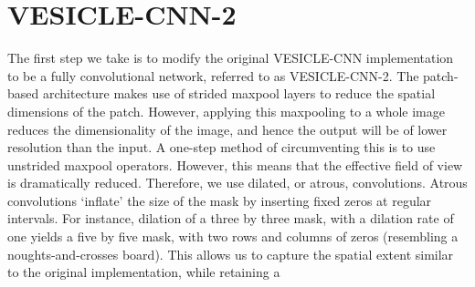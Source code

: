 \documentclass{article}
\begin{document}
\section*{VESICLE-CNN-2}
\label{sec:methods:vesicle}
The first step we take is to modify the original VESICLE-CNN implementation~\citep{roncal2014vesicle} to be a fully convolutional network, referred to as VESICLE-CNN-2.
The patch-based architecture makes use of strided maxpool layers to reduce the spatial dimensions of the patch.
However, applying this maxpooling to a whole image reduces the dimensionality of the image, and hence the output will be of lower resolution than the input.
A one-step method of circumventing this is to use unstrided maxpool operators.
However, this means that the effective field of view is dramatically reduced.
Therefore, we use dilated, or atrous, convolutions.
Atrous convolutions `inflate' the size of the mask by inserting fixed zeros at regular intervals.
For instance, dilation of a three by three mask, with a dilation rate of one yields a five by five mask, with two rows and columns of zeros (resembling a noughts-and-crosses board).
This allows us to capture the spatial extent similar to the original implementation, while retaining a{%
\parfillskip=0pt
\parskip=0pt
\par}
\end{document}
